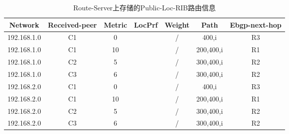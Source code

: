 
\begin{table}[h]
	\centering
	\caption{Route-Server上存储的Public-Loc-RIB路由信息}
    \label{tab:weight-example}
    \begin{tabular}{@{}ccccccc@{}}
    \toprule
    Network     & Received-peer & Metric & LocPrf & Weight & Path      & Ebgp-next-hop \\ \midrule
    192.168.1.0 & C1            & 0      &        & /      & 400,i     & R3            \\
    192.168.1.0 & C1            & 10     &        & /      & 200,400,i & R1            \\
    192.168.1.0 & C2            & 5      &        & /      & 300,400,i & R2            \\
    192.168.1.0 & C3            & 6      &        & /      & 300,400,i & R2            \\
    192.168.2.0 & C1            & 0      &        & /      & 400,i     & R3            \\
    192.168.2.0 & C1            & 10     &        & /      & 200,400,i & R1            \\
    192.168.2.0 & C2            & 5      &        & /      & 300,400,i & R2            \\
    192.168.2.0 & C3            & 6      &        & /      & 300,400,i & R2            \\ \bottomrule
    \end{tabular}
\end{table}


